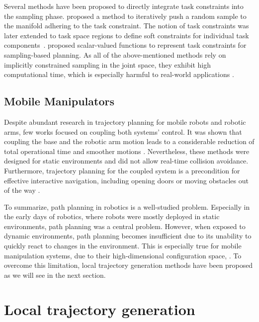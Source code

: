 Several methods have been proposed to
directly integrate task constraints into the sampling phase.
\cite{Stilman2010} proposed a method to iteratively push a
random sample to the manifold adhering to the task
constraint. The notion of task constraints was later
extended to task space regions to define soft constraints
for individual task components~\cite{Berenson2011}.
\cite{Kingston2019} proposed scalar-valued functions to
represent task constraints for sampling-based planning. As
all of the above-mentioned methods rely on implicitly
constrained sampling in the joint space, they exhibit high
computational time, which is especially harmful to
real-world applications \cite{Qureshi2020}.

\subsection{Mobile Manipulators}
\label{sub:mobile_manipulators}

Despite abundant research in trajectory planning for mobile robots and robotic
arms, few works focused on coupling both systems' control. It was shown that
coupling the base and the robotic arm motion leads to a considerable reduction
of total operational time and smoother motions \cite{Thakar2018, Thakar2019}.
Nevertheless, these methods were designed for static environments and did not
allow real-time collision avoidance. Furthermore, trajectory planning for the
coupled system is a precondition for effective interactive navigation, including
opening doors \cite{Jain2009, Chitta2010} or moving obstacles out of the way
\cite{Li2019}.

To summarize, path planning in robotics is a well-studied
problem. Especially in the early days of robotics, where
robots were mostly deployed in static environments, path
planning was a central problem. However, when exposed to
dynamic environments, path planning becomes insufficient due
to its unability to quickly react to changes in the
environment. This is especially true for mobile manipulation
systems, due to their high-dimensional configuration space,
\cite{Avanzini2018}. To overcome this limitation, local
trajectory generation methods have been proposed as we will
see in the next section.

\section{Local trajectory generation}
\label{sec:local_trajectory_generation}

